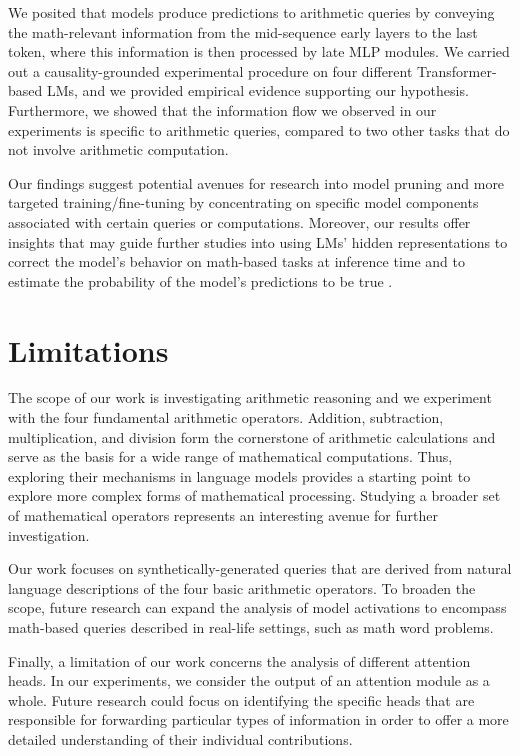 \documentclass[11pt]{article}
\begin{document}
We posited that models produce predictions to arithmetic queries by conveying the math-relevant information from the mid-sequence early layers to the last token, where this information is then processed by late MLP modules.
We carried out a causality-grounded experimental procedure on four different Transformer-based LMs, and we provided empirical evidence supporting our hypothesis. Furthermore, we showed that the information flow we observed in our experiments is specific to arithmetic queries, compared to two other tasks that do not involve arithmetic computation.

Our findings suggest potential avenues for research into model pruning and more targeted training/fine-tuning by concentrating on specific model components associated with certain queries or computations.
Moreover, our results offer insights that may guide further studies into using LMs' hidden representations to correct the model's behavior on math-based tasks at inference time \cite{li2023inferencetime} and to estimate the probability of the model's predictions to be true \cite{burns2023discovering}.




\section*{Limitations}



The scope of our work is investigating arithmetic reasoning and we experiment with the four fundamental arithmetic operators. Addition, subtraction, multiplication, and division form the cornerstone of arithmetic calculations and serve as the basis for a wide range of mathematical computations. Thus, exploring their mechanisms in language models provides a starting point to explore more complex forms of mathematical processing. Studying a broader set of mathematical operators represents an interesting avenue for further investigation.

Our work focuses on synthetically-generated queries that are derived from natural language descriptions of the four basic arithmetic operators. To broaden the scope, future research can expand the analysis of model activations to encompass math-based queries described in real-life settings, such as math word problems. 



Finally, a limitation of our work concerns the analysis of different attention heads. In our experiments, we consider the output of an attention module as a whole. Future research could focus on identifying the specific heads that are responsible for forwarding particular types of information in order to offer a more detailed understanding of their individual contributions.
\end{document}

